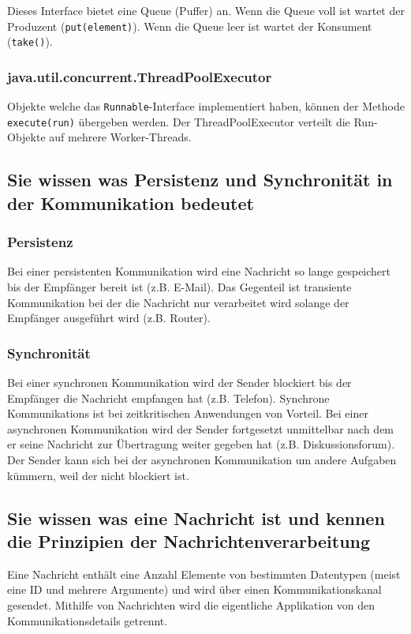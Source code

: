 Dieses Interface bietet eine Queue (Puffer) an. Wenn die Queue voll ist wartet der Produzent (\texttt{put(element)}). Wenn die Queue leer ist wartet der Konsument (\texttt{take()}).

\subsubsection{java.util.concurrent.ThreadPoolExecutor}

Objekte welche das \texttt{Runnable}-Interface implementiert haben, können der Methode \texttt{execute(run)} übergeben werden. Der ThreadPoolExecutor verteilt die Run-Objekte auf mehrere Worker-Threads. 

\subsection{Sie wissen was Persistenz und Synchronität in der Kommunikation bedeutet}

\subsubsection{Persistenz}

Bei einer persistenten Kommunikation wird eine Nachricht so lange gespeichert bis der Empfänger bereit ist (z.B. E-Mail). Das Gegenteil ist transiente Kommunikation bei der die Nachricht nur verarbeitet wird solange der Empfänger ausgeführt wird (z.B. Router). 

\subsubsection{Synchronität}

Bei einer synchronen Kommunikation wird der Sender blockiert bis der Empfänger die Nachricht empfangen hat (z.B. Telefon). Synchrone Kommunikations ist bei zeitkritischen Anwendungen von Vorteil. Bei einer asynchronen Kommunikation wird der Sender fortgesetzt unmittelbar nach dem er seine Nachricht zur Übertragung weiter gegeben hat (z.B. Diskussionsforum). Der Sender kann sich bei der asynchronen Kommunikation um andere Aufgaben kümmern, weil der nicht blockiert ist.

\subsection{Sie wissen was eine Nachricht ist und kennen die Prinzipien der Nachrichtenverarbeitung}

Eine Nachricht enthält eine Anzahl Elemente von bestimmten Datentypen (meist eine ID und mehrere Argumente) und wird über einen Kommunikationskanal gesendet. Mithilfe von Nachrichten wird die eigentliche Applikation von den Kommunikationsdetails getrennt.


